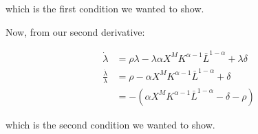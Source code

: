 which is the first condition we wanted to show.

Now, from our second derivative:

\begin{align}
    \dot{\lambda} &= \rho \lambda - \lambda \alpha X^M K^{\alpha-1} \bar{L}^{1-\alpha} + \lambda \delta \\
    \frac{\dot{\lambda}}{\lambda} &= \rho - \alpha X^M K^{\alpha-1} \bar{L}^{1-\alpha} + \delta \\
    &= -(\alpha X^M K^{\alpha-1} \bar{L}^{1-\alpha} - \delta - \rho)
\end{align}

which is the second condition we wanted to show.